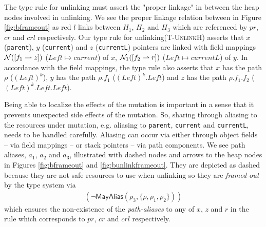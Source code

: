 The type rule for unlinking must assert the "proper linkage" in between the heap nodes involved in unlinking. We see the proper linkage relation between in Figure \ref{fig:bframeout} as red $l$ links between $H_1$, $H_2$ and $H_3$ which are referenced by $pr$, $cr$ and $crl$ respectively. Our type rule for unlinking(\textsc{T-UnlinkH}) asserts that $x$ (\texttt{parent}), $y$ (\texttt{current}) and $z$ (\texttt{currentL}) pointers are linked with field mappings $\mathcal{N}([f_1\rightharpoonup z])$ ($Left \mapsto current$) of $x$, $\mathcal{N}_1([f_2\rightharpoonup r])$ ($Left \mapsto currentL$) of $y$. In accordance with the field mappings, the type rule also asserts that $x$ has the path $\rho$ ($(Left)^{k}$), $y$ has the path $\rho.f_1$ ($(Left)^{k}.Left$) and $z$ has the path $\rho.f_1.f_2$ ($(Left)^{k}.Left.Left$).

Being able to localize the effects of the mutation is important in a sense that it prevents unexpected side effects of the mutation. So, sharing through aliasing to the resources under mutation, e.g. aliasing to \texttt{parent}, \texttt{current} and \texttt{currentL}, needs to be handled carefully. Aliasing can occur via either through  object fields -- via field mappings -- or stack pointers -- via path components. We see path aliases, $a_1$, $a_2$ and $a_3$, illustrated with dashed nodes and arrows to the heap nodes in Figures \ref{fig:bframeout} and \ref{fig:bunlinkframeout}. They are depicted as dashed because they are not safe resources to use when unlinking so they are \textit{framed-out} by the type system via
\[
\begin{array}{l}
(\neg\mathsf{MayAlias}(\rho_3,\{\rho,\rho_1,\rho_2\})  ) 
\end{array}
\]
which ensures the non-existence of the \textit{path-aliases} to any of $x$, $z$ and $r$ in the rule which corresponds to $pr$, $cr$ and $crl$ respectively.

